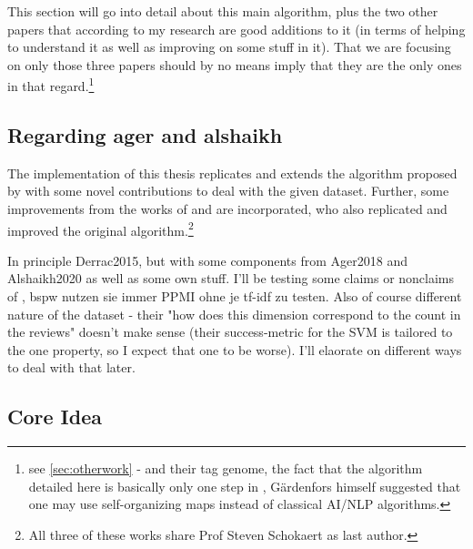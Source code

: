 


This section will go into detail about this main algorithm, plus the two other papers that according to my research are good additions to it (in terms of helping to understand it as well as improving on some stuff in it). That we are focusing on only those three papers should by no means imply that they are the only ones in that regard.\footnote{see \autoref{sec:otherwork} - \cite{VISR12} and their tag genome, the fact that the algorithm detailed here is basically only one step in \cite{Alshaikh2019}, Gärdenfors himself suggested that one may use self-organizing maps instead of classical AI/NLP algorithms.}

\subsection{Regarding ager and alshaikh}


The implementation of this thesis replicates and extends the algorithm proposed by \textcite{Derrac2015} with some novel contributions to deal with the given dataset. Further, some improvements from the works of \textcite{Ager2018} and \textcite{Alshaikh2020} are incorporated, who also replicated and improved the original algorithm.\footnote{All three of these works share Prof Steven Schokaert as last author.}

In principle Derrac2015, but with some components from Ager2018 and Alshaikh2020 as well as some own stuff. I'll be testing some claims or nonclaims of \mainalgos, bspw nutzen sie immer PPMI ohne je tf-idf zu testen. Also of course different nature of the dataset - their "how does this dimension correspond to the count in the reviews" doesn't make sense (their success-metric for the SVM is tailored to the one property, so I expect that one to be worse). I'll elaorate on different ways to deal with that later.




\subsection{Core Idea}

